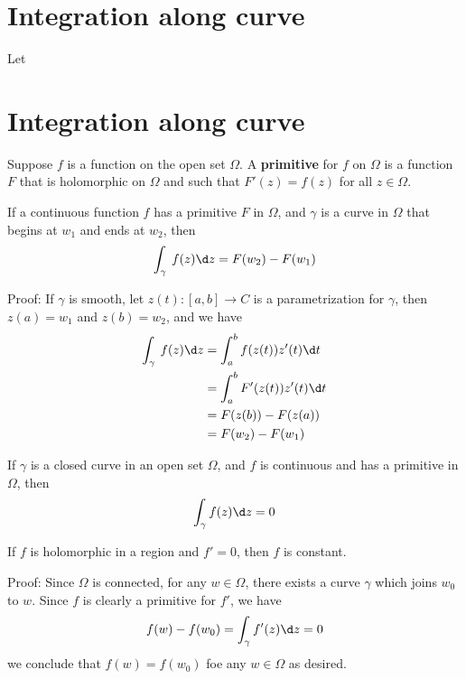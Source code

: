 \documentclass[12pt, oneside]{book}
\begin{document}
\section{Integration along curve}

\begin{definition}
    Let
\end{definition}













\section{Integration along curve}
\begin{definition}
    Suppose $f$ is a function on the open set $\Omega$. A \textbf{primitive} for $f$ on $\Omega$ is a function $F$ that is holomorphic on $\Omega$ and such that $F'(z)=f(z)$ for all $z\in\Omega.$
\end{definition}
\begin{theorem}
    If a continuous function $f$ has a primitive $F$ in $\Omega$, and
    $\gamma$ is a curve in $\Omega$ that begins at $w_1$ and ends at $w_2$, then
    $$\int_\gamma\: f(z)\d z=F(w_2)-F(w_1)$$

    Proof: If $\gamma$ is smooth, let  $z(t):[a,b]\longrightarrow C$ is a parametrization for $\gamma$, then $z(a)=w_1$ and $z(b)=w_2$, and we have
    $$\begin{aligned}
            \int_{\gamma}\:f(z) \d z & =\int_a^bf(z(t))z'(t)\d t                  \\
                                     & =\int_a^bF^{\prime}(z(t))z^{\prime}(t)\d t \\
                                     & =F(z(b))-F(z(a))                           \\
                                     & =F(w_2)-F(w_1)
        \end{aligned}$$
\end{theorem}
\begin{corollary}
    If $\gamma$ is a closed curve in an open set $\Omega$, and $f$ is continuous and has a primitive in $\Omega$, then
    $$\int_\gamma f(z)\d z=0$$
\end{corollary}
\begin{corollary}
    If $f$ is holomorphic in a region and $ f'=0 $, then  $f$ is constant.

    Proof: Since $\Omega$ is connected, for any $w\in\Omega$, there exists a curve $\gamma$ which joins
    $w_0$ to $w$. Since $f$ is clearly a primitive for $f'$, we have
    $$f(w)-f(w_0)=\int_{\gamma}f'(z)\d z=0$$
    we conclude that $f(w)=f(w_0)$ foe any $w\in\Omega$ as desired.
\end{corollary}
\end{document}
